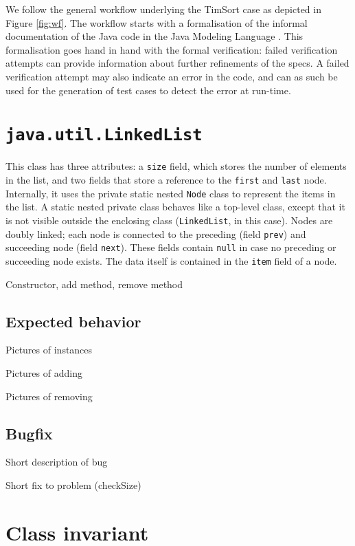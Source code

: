 \documentclass[runningheads]{llncs}
\begin{document}
We follow the general workflow underlying the TimSort case as depicted in Figure \ref{fig:wf}. The workflow starts with a formalisation of the informal documentation of the Java code in the Java Modeling Language \cite{LeavensBR99}. %
This formalisation goes hand in hand with the formal verification: failed verification attempts can provide information about
further refinements of the specs. A failed verification attempt may also indicate an error in the code,
and can as such be used for the generation of test cases to detect the error at run-time.

\section{\texttt{java.util.LinkedList}}\label{sec:linkedlist}

This class has three attributes: a \texttt{size} field, which stores the number of elements in the list, and two
fields that store a reference to the \texttt{first} and \texttt{last} node. Internally, it uses the private static nested \texttt{Node} class to represent the items in the list. A static nested private class behaves like a top-level class, except that it is not visible outside the enclosing class (\texttt{LinkedList}, in this case). Nodes are doubly linked; each node is connected to the preceding (field \texttt{prev}) and succeeding node (field \texttt{next}). These fields contain \texttt{null} in case no preceding or succeeding node exists. The data itself is contained in the \texttt{item} field of a node.



Constructor, add method, remove method

\subsection{Expected behavior}
Pictures of instances

Pictures of adding

Pictures of removing

\subsection{Bugfix}
Short description of bug

Short fix to problem (checkSize)

\section{Class invariant}\label{sec:class-invariant}
\end{document}
